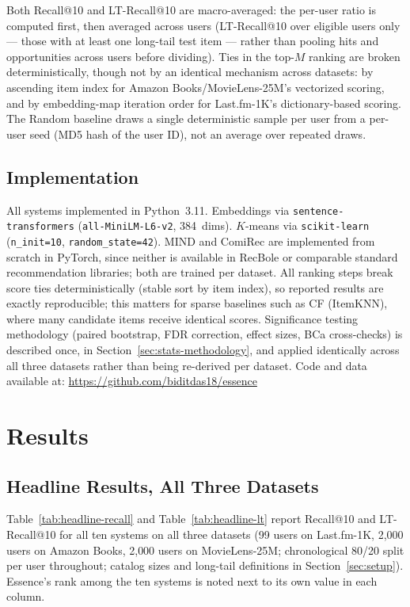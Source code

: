 \documentclass[11pt,a4paper]{article}
\begin{document}
Both Recall@10 and LT-Recall@10 are macro-averaged: the per-user ratio is
computed first, then averaged across users (LT-Recall@10 over eligible
users only --- those with at least one long-tail test item --- rather
than pooling hits and opportunities across users before dividing). Ties
in the top-$M$ ranking are broken deterministically, though not by an
identical mechanism across datasets: by ascending item index for Amazon
Books/MovieLens-25M's vectorized scoring, and by embedding-map iteration
order for Last.fm-1K's dictionary-based scoring. The Random baseline
draws a single deterministic sample per user from a per-user seed (MD5
hash of the user ID), not an average over repeated draws.

\subsection{Implementation}
All systems implemented in Python~3.11. Embeddings via
\texttt{sentence-transformers} (\texttt{all-MiniLM-L6-v2}, 384~dims).
$K$-means via \texttt{scikit-learn} (\texttt{n\_init=10},
\texttt{random\_state=42}). MIND and ComiRec are implemented from scratch
in PyTorch, since neither is available in RecBole or comparable standard
recommendation libraries; both are trained per dataset.
All ranking steps break score ties deterministically (stable sort by item
index), so reported results are exactly reproducible; this matters for sparse
baselines such as CF (ItemKNN), where many candidate items receive identical
scores.
Significance testing methodology (paired bootstrap, FDR correction, effect
sizes, BCa cross-checks) is described once, in
Section~\ref{sec:stats-methodology}, and applied identically across all
three datasets rather than being re-derived per dataset.
Code and data available at:
\url{https://github.com/biditdas18/essence}

\section{Results}
\label{sec:results}

\subsection{Headline Results, All Three Datasets}
\label{sec:headline}

Table~\ref{tab:headline-recall} and Table~\ref{tab:headline-lt} report
Recall@10 and LT-Recall@10 for all ten systems on all three datasets (99
users on Last.fm-1K, 2{,}000 users on Amazon Books, 2{,}000 users on
MovieLens-25M; chronological 80/20 split per user throughout; catalog
sizes and long-tail definitions in Section~\ref{sec:setup}). Essence's
rank among the ten systems is noted next to its own value in each column.
\end{document}
